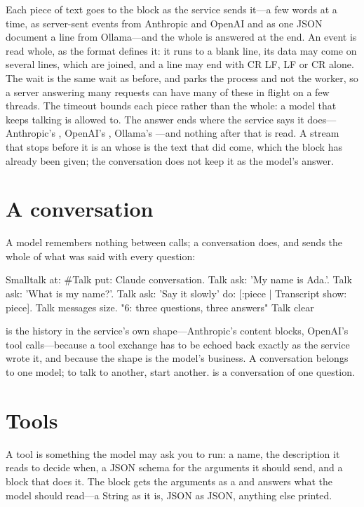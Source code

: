 Each piece of text goes to the block as the service sends it---a few words
at a time, as server-sent events from Anthropic and OpenAI and as one JSON
document a line from Ollama---and the whole is answered at the end. An
event is read whole, as the format defines it: it runs to a blank line, its
data may come on several  lines, which are joined, and a line may
end with CR LF, LF or CR alone. The
wait is the same wait as before, and parks the process and not the worker,
so a server answering many requests can have many of these in flight on a
few threads. The timeout bounds each piece rather than the whole: a model
that keeps talking is allowed to. The answer ends where the service says it
does---Anthropic's , OpenAI's ,
Ollama's ---and nothing after that is read. A stream that
stops before it is an  whose  is the text that did
come, which the block has already been given; the conversation does not
keep it as the model's answer.

\section{A conversation}

A model remembers nothing between calls; a conversation does, and sends
the whole of what was said with every question:

\begin{st}
Smalltalk at: #Talk put: Claude conversation.
Talk ask: 'My name is Ada.'.
Talk ask: 'What is my name?'.
Talk ask: 'Say it slowly' do: [:piece | Transcript show: piece].
Talk messages size.                             "6: three questions, three answers"
Talk clear
\end{st}

 is the history in the service's own shape---Anthropic's
content blocks, OpenAI's tool calls---because a tool exchange has to be
echoed back exactly as the service wrote it, and because the shape is the
model's business. A conversation belongs to one model; to talk to another,
start another.  is a conversation of one question.

\section{Tools}

A tool is something the model may ask you to run: a name, the description
it reads to decide when, a JSON schema for the arguments it should send,
and a block that does it. The block gets the arguments as a
 and answers what the model should read---a String as it
is, JSON as JSON, anything else printed.

